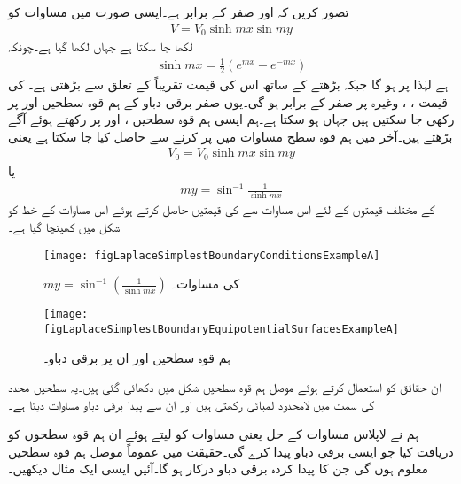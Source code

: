تصور کریں کہ  اور  صفر کے برابر ہے۔ایسی صورت میں مساوات  کو
\begin{align}\label{مساوات_لاپلاس_اندازہ_ث}
V=V_0 \sinh mx \sin my
\end{align}
لکھا جا سکتا ہے جہاں  لکھا گیا ہے۔چونکہ
\begin{align*}
\sinh mx = \frac{1}{2}\left(e^{mx}-e^{-mx} \right)
\end{align*}
ہے لہٰذا  پر  ہو گا جبکہ بڑھتے  کے ساتھ اس کی قیمت تقریباً  کے تعلق سے بڑھتی ہے۔ کی قیمت ، ،  وغیرہ پر صفر کے برابر ہو گی۔یوں صفر برقی دباو کے ہم قوہ سطحیں  اور   پر رکھی جا سکتیں ہیں جہاں  ہو سکتا ہے۔ہم ایسی ہم قوہ سطحیں ،  اور
   پر رکھتے ہوئے آگے بڑھتے ہیں۔آخر میں  ہم قوہ سطح مساوات  میں  پر کرنے سے حاصل کیا جا سکتا ہے یعنی
\begin{align*}
V_0=V_0 \sinh mx \sin my
\end{align*}
یا 
\begin{align*}
my = \sin^{-1} \frac{1}{\sinh mx}
\end{align*}
 کے مختلف قیمتوں کے لئے اس مساوات سے  کی قیمتیں حاصل کرتے ہوئے اس مساوات کے خط کو شکل  میں کھینچا گیا ہے۔
\begin{figure}
\centering
\texttt{[image: figLaplaceSimplestBoundaryConditionsExampleA]}
\caption{$my=\sin^{-1} \left(\tfrac{1}{\sinh mx}\right)$ کی مساوات۔}
\label{شکل_لاپلاس_سرحدی_شرائط_الف}
\end{figure}
%
\begin{figure}
\centering
\texttt{[image: figLaplaceSimplestBoundaryEquipotentialSurfacesExampleA]}
\caption{ہم قوہ سطحیں اور ان پر برقی دباو۔}
\label{شکل_لاپلاس_سرحدی_شرائط_ہم_قوہ_سطحیں_الف}
\end{figure}

ان حقائق کو استعمال کرتے ہوئے موصل ہم قوہ سطحیں شکل  میں دکھائی گئی ہیں۔یہ سطحیں  محدد کی سمت میں لامحدود لمبائی رکھتی ہیں اور ان سے پیدا برقی دباو مساوات  دیتا ہے۔

ہم نے لاپلاس مساوات کے حل یعنی مساوات  کو لیتے ہوئے ان ہم قوہ سطحوں کو دریافت کیا جو ایسی برقی دباو پیدا کرے گی۔حقیقت میں عموماً موصل ہم قوہ سطحیں معلوم ہوں گی جن کا پیدا کردہ برقی دباو درکار ہو گا۔آئیں ایسی ایک مثال دیکھیں۔


